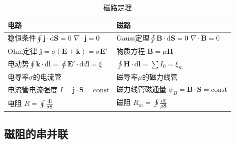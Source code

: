 \documentclass[12pt,onecolumn,a4paper]{book}
\numberwithin{table}{subsection}
\numberwithin{equation}{subsection}
\begin{document}
    \begin{table}[h!]
        \centering
        \begin{tabular}{ll}
            \hline
            \textbf{电路}                                                                                                          & \textbf{磁路}                                                                                                   \\
            \hline
            稳恒条件$\displaystyle \oint \mathbf{j} \cdot \mathrm{d}\mathbf{S} = 0$ \newline $\nabla \cdot \mathbf{j} = 0$           & Gauss定理$\displaystyle \oint \mathbf{B} \cdot \mathrm{d}\mathbf{S} = 0$ \newline $\nabla \cdot \mathbf{B} = 0$ \\
            Ohm定律 $\mathbf{j} = \sigma(\mathbf{E} + \mathbf{k}) = \sigma\mathbf{E}'$                                             & 物质方程 $\mathbf{B} = \mu\mathbf{H}$                                                                             \\
            电动势$\displaystyle \oint \mathbf{k} \cdot \mathrm{d}\mathbf{l} = \oint \mathbf{E}' \cdot \mathrm{d}d\mathbf{l} = \xi$ & $\displaystyle \oint \mathbf{H} \cdot \mathrm{d}\mathbf{l} = \sum I_0 = \xi_m$                                \\
            电导率$\sigma$的电流管                                                                                                      & 磁导率$\mu$的磁力线管                                                                                                 \\
            电流管电流强度 $I = \mathbf{j} \cdot \mathbf{S} = \text{const}$                                                             & 磁力线管磁通量 $\psi_B = \mathbf{B} \cdot \mathbf{S} = \text{const}$                                                 \\
            电阻 $R =\oint \frac{ \mathrm{d}\mathbf{l}}{\sigma\mathbf{S}}$                                                         & 磁阻 $R_m = \oint \frac{ \mathrm{d}\mathbf{l}}{\mu\mathbf{S}}$                                                  \\
            \hline
        \end{tabular}
        \caption{磁路定理}
    \end{table}

    \subsection{磁阻的串并联}
\end{document}
